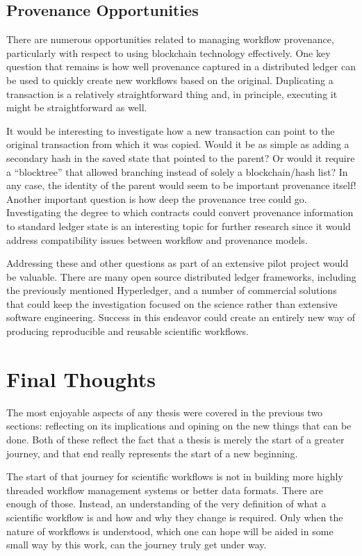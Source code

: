 \subsection{Provenance Opportunities}

There are numerous opportunities related to managing workflow provenance,
particularly with respect to using blockchain technology effectively. One
key question that remains is how well provenance captured in a distributed
ledger can be used to quickly create new workflows based on the original.
Duplicating a transaction is a relatively straightforward thing and, in
principle, executing it might be straightforward as well.

It would be interesting to investigate how a new transaction can point to the
original transaction from which it was copied. Would it be as simple as adding a
secondary hash in the saved state that pointed to the parent? Or would it
require a “blocktree” that allowed branching instead of solely a blockchain/hash
list? In any case, the identity of the parent would seem to be important
provenance itself! Another important question is how deep the provenance tree
could go. Investigating the degree to which contracts could convert provenance
information to standard ledger state is an interesting topic for further
research since it would address compatibility issues between workflow and
provenance models.

Addressing these and other questions as part of an extensive pilot project would
be valuable. There are many open source distributed ledger frameworks, including
the previously mentioned Hyperledger, and a number of commercial solutions that
could keep the investigation focused on the science rather than extensive
software engineering. Success in this endeavor could create an entirely new way
of producing reproducible and reusable scientific workflows.

\section{Final Thoughts}

The most enjoyable aspects of any thesis were covered in the previous two
sections: reflecting on its implications and opining on the new things that
can be done. Both of these reflect the fact that a thesis is merely the start
of a greater journey, and that end really represents the start of a new
beginning.

The start of that journey for scientific workflows is not in building more
highly threaded workflow management systems or better data formats. There are
enough of those. Instead, an understanding of the very definition of what a
scientific workflow is and how and why they change is required. Only when the
nature of workflows is understood, which one can hope will be aided in some small
way by this work, can the journey truly get under way.